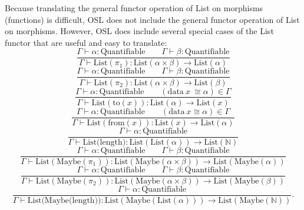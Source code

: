\documentclass[11pt]{article}
\begin{document}
Because translating the general functor operation of List on morphisms
(functions) is difficult, OSL does not include the general functor
operation of List on morphisms. However, OSL does include several
special cases of the List functor that are useful and easy to translate:
\begin{equation}
	\frac{\Gamma \vdash \alpha : \text{Quantifiable}
	\qquad \Gamma \vdash \beta : \text{Quantifiable}}
	{\Gamma \vdash \text{List}(\pi_1)
	: \text{List}(\alpha \times \beta) \to \text{List}(\alpha)}
\end{equation}
\begin{equation}
	\frac{\Gamma \vdash \alpha : \text{Quantifiable}
	\qquad \Gamma \vdash \beta : \text{Quantifiable}}
	{\Gamma \vdash \text{List}(\pi_2)
	: \text{List}(\alpha \times \beta) \to \text{List}(\beta)}
\end{equation}
\begin{equation}
	\frac{\Gamma \vdash \alpha : \text{Quantifiable}
	\qquad (\text{data}\ x\ \cong \alpha) \in \Gamma}
	{\Gamma \vdash \text{List}(\text{to}(x))
	: \text{List}(\alpha) \to \text{List}(x)}
\end{equation}
\begin{equation}
	\frac{\Gamma \vdash \alpha : \text{Quantifiable}
	\qquad (\text{data}\ x \cong \alpha) \in \Gamma}
	{\Gamma \vdash \text{List}(\text{from}(x))
	: \text{List}(x) \to \text{List}(\alpha)}
\end{equation}
\begin{equation}
	\frac{\Gamma \vdash \alpha : \text{Quantifiable}}
	{\Gamma \vdash \text{List(length)}
	: \text{List}(\text{List}(\alpha)) \to \text{List}(\mathbb{N})}
\end{equation}
\begin{equation}
	\frac{\Gamma \vdash \alpha : \text{Quantifiable}
	\qquad \Gamma \vdash \beta : \text{Quantifiable}}
	{\Gamma \vdash \text{List}(\text{Maybe}(\pi_1))
	: \text{List}(\text{Maybe}(\alpha \times \beta)) \to \text{List}(\text{Maybe}(\alpha))}
\end{equation}
\begin{equation}
	\frac{\Gamma \vdash \alpha : \text{Quantifiable}
	\qquad \Gamma \vdash \beta : \text{Quantifiable}}
	{\Gamma \vdash \text{List}(\text{Maybe}(\pi_2))
	: \text{List}(\text{Maybe}(\alpha \times \beta)) \to \text{List}(\text{Maybe}(\beta))}
\end{equation}
\begin{equation}
	\frac{\Gamma \vdash \alpha : \text{Quantifiable}}
	{\Gamma \vdash \text{List(Maybe(length))} : \text{List}(\text{Maybe}(\text{List}(\alpha))) \to \text{List}(\text{Maybe}(\mathbb{N}))}.
\end{equation}
\end{document}
